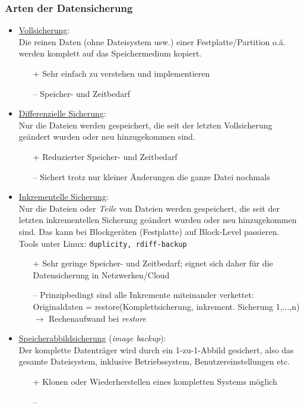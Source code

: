 \subsubsection{Arten der Datensicherung}
\begin{itemize}
	\item \underline{Vollsicherung}:\\
	Die reinen Daten (ohne Dateisystem usw.) einer Festplatte/Partition o.ä. werden komplett auf das Speichermedium kopiert.
	\begin{itemize}
		\item[+] Sehr einfach zu verstehen und implementieren
		\item[--] Speicher- und Zeitbedarf
	\end{itemize}
	\item \underline{Differenzielle Sicherung}:\\ Nur die Dateien werden gespeichert, die seit der letzten Vollsicherung geändert wurden oder neu hinzugekommen sind.
	\begin{itemize}
		\item[+] Reduzierter Speicher- und Zeitbedarf
		\item[--] Sichert trotz nur kleiner Änderungen die ganze Datei nochmals
	\end{itemize}
	\item \underline{Inkrementelle Sicherung}:\\ Nur die Dateien oder \textit{Teile} von Dateien werden gespeichert, die seit der letzten inkrementellen Sicherung geändert wurden oder neu hinzugekommen sind. Das kann bei Blockgeräten (Festplatte) auf Block-Level passieren.\\
	Tools unter Linux: \texttt{duplicity, rdiff-backup}
	\begin{itemize}
		\item[+] Sehr geringe Speicher- und Zeitbedarf; eignet sich daher für die Datensicherung in Netzwerken/Cloud
		\item[--] Prinzipbedingt sind alle Inkremente miteinander verkettet:\\
		Originaldaten = restore(Komplettsicherung, inkrement. Sicherung 1,...,n)\\
		$\to$ Rechenaufwand bei \textit{restore}
	\end{itemize}
	\item \underline{Speicherabbildsicherung} (\textit{image backup}):\\
Der komplette Datenträger wird durch ein 1-zu-1-Abbild gesichert, also das gesamte Dateisystem, inklusive Betriebssystem, Benutzereinstellungen etc.
\begin{itemize}
	\item[+] Klonen oder Wiederherstellen eines kompletten Systems möglich
	\item[--]
\end{itemize}
\end{itemize}

